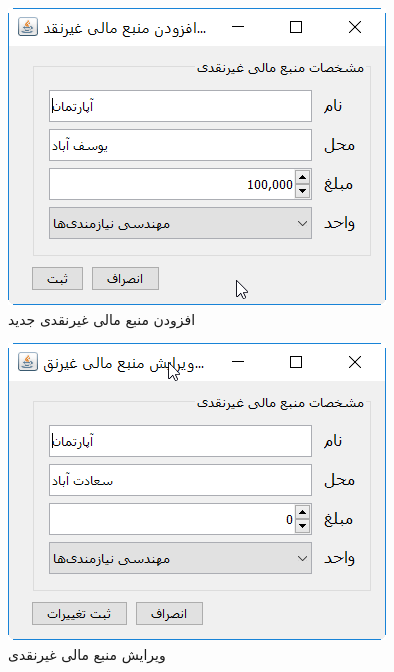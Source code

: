 \begin{figure}[H]
	\centering
	\includegraphics[scale=0.8]{img/prot/AddNewFinanceResource_nochach}
	\caption{افزودن منبع مالی غیرنقدی جدید}
\end{figure}
\begin{figure}[H]
	\centering
	\includegraphics[scale=0.8]{img/prot/EditFinanceResource_nocach}
	\caption{ویرایش منبع مالی غیرنقدی }
\end{figure}

